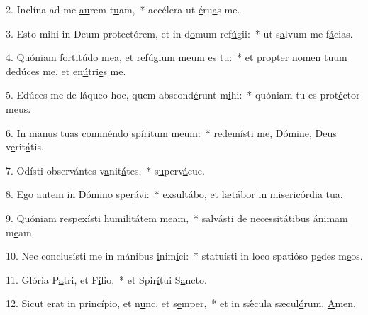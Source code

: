 2. Inclína ad me \uline{au}rem t\uline{u}am,~* accélera ut \uline{é}ru\uline{a}s me.\par 
3. Esto mihi in Deum protectórem, et in d\uline{o}mum ref\uline{ú}gii:~* ut s\uline{a}lvum me f\uline{á}cias.\par 
4. Quóniam fortitúdo mea, et refúgium m\uline{e}um \uline{e}s tu:~* et propter nomen tuum dedúces me, et en\uline{ú}tri\uline{e}s me.\par 
5. Edúces me de láqueo hoc, quem abscond\uline{é}runt m\uline{i}hi:~* quóniam tu es prot\uline{é}ctor m\uline{e}us.\par 
6. In manus tuas comméndo sp\uline{í}ritum m\uline{e}um:~* redemísti me, Dómine, Deus v\uline{e}rit\uline{á}tis.\par 
7. Odísti observántes v\uline{a}nit\uline{á}tes,~* s\uline{u}perv\uline{á}cue.\par 
8. Ego autem in Dómin\uline{o} sper\uline{á}vi:~* exsultábo, et lætábor in miseric\uline{ó}rdia t\uline{u}a.\par 
9. Quóniam respexísti humilit\uline{á}tem m\uline{e}am,~* salvásti de necessitátibus \uline{á}nimam m\uline{e}am.\par 
10. Nec conclusísti me in mánibus \uline{i}nim\uline{í}ci:~* statuísti in loco spatióso p\uline{e}des m\uline{e}os.\par 
11. Glória P\uline{a}tri, et F\uline{í}lio,~* et Spir\uline{í}tui S\uline{a}ncto.\par 
12. Sicut erat in princípio, et n\uline{u}nc, et s\uline{e}mper,~* et in sǽcula sæcul\uline{ó}rum. \uline{A}men.\par 
